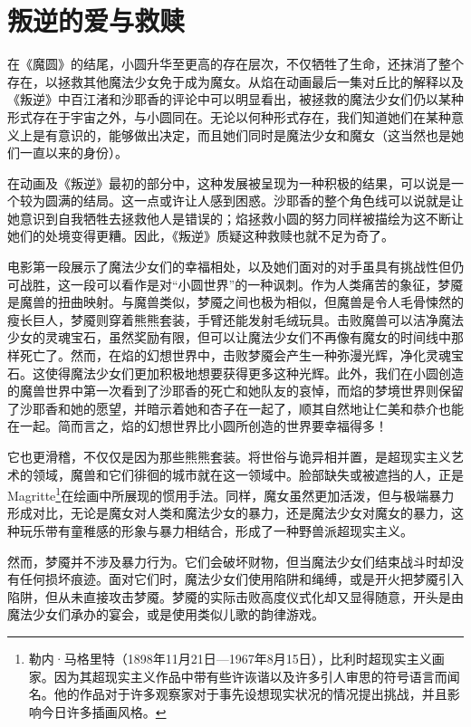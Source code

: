 \chapter{叛逆的爱与救赎}
在《魔圆》的结尾，小圆升华至更高的存在层次，不仅牺牲了生命，还抹消了整个存在，以拯救其他魔法少女免于成为魔女。从焰在动画最后一集对丘比的解释以及《叛逆》中百江渚和沙耶香的评论中可以明显看出，被拯救的魔法少女们仍以某种形式存在于宇宙之外，与小圆同在。无论以何种形式存在，我们知道她们在某种意义上是有意识的，能够做出决定，而且她们同时是魔法少女和魔女（这当然也是她们一直以来的身份）。

在动画及《叛逆》最初的部分中，这种发展被呈现为一种积极的结果，可以说是一个较为圆满的结局。这一点或许让人感到困惑。沙耶香的整个角色线可以说就是让她意识到自我牺牲去拯救他人是错误的；焰拯救小圆的努力同样被描绘为这不断让她们的处境变得更糟。因此，《叛逆》质疑这种救赎也就不足为奇了。

电影第一段展示了魔法少女们的幸福相处，以及她们面对的对手虽具有挑战性但仍可战胜，这一段可以看作是对“小圆世界”的一种讽刺。作为人类痛苦的象征，梦魇是魔兽的扭曲映射。与魔兽类似，梦魇之间也极为相似，但魔兽是令人毛骨悚然的瘦长巨人，梦魇则穿着熊熊套装，手臂还能发射毛绒玩具。击败魔兽可以洁净魔法少女的灵魂宝石，虽然奖励有限，但可以让魔法少女们不再像有魔女的时间线中那样死亡了。然而，在焰的幻想世界中，击败梦魇会产生一种弥漫光辉，净化灵魂宝石。这使得魔法少女们更加积极地想要获得更多这种光辉。此外，我们在小圆创造的魔兽世界中第一次看到了沙耶香的死亡和她队友的哀悼，而焰的梦境世界则保留了沙耶香和她的愿望，并暗示着她和杏子在一起了，顺其自然地让仁美和恭介也能在一起。简而言之，焰的幻想世界比小圆所创造的世界要幸福得多！

它也更滑稽，不仅仅是因为那些熊熊套装。将世俗与诡异相并置，是超现实主义艺术的领域，魔兽和它们徘徊的城市就在这一领域中。脸部缺失或被遮挡的人，正是 Magritte\footnote{勒内·马格里特（1898年11月21日—1967年8月15日），比利时超现实主义画家。因为其超现实主义作品中带有些许诙谐以及许多引人审思的符号语言而闻名。他的作品对于许多观察家对于事先设想现实状况的情况提出挑战，并且影响今日许多插画风格。}在绘画中所展现的惯用手法。同样，魔女虽然更加活泼，但与极端暴力形成对比，无论是魔女对人类和魔法少女的暴力，还是魔法少女对魔女的暴力，这种玩乐带有童稚感的形象与暴力相结合，形成了一种野兽派超现实主义。

然而，梦魇并不涉及暴力行为。它们会破坏财物，但当魔法少女们结束战斗时却没有任何损坏痕迹。面对它们时，魔法少女们使用陷阱和绳缚，或是开火把梦魇引入陷阱，但从未直接攻击梦魇。梦魇的实际击败高度仪式化却又显得随意，开头是由魔法少女们承办的宴会，或是使用类似儿歌的韵律游戏。

